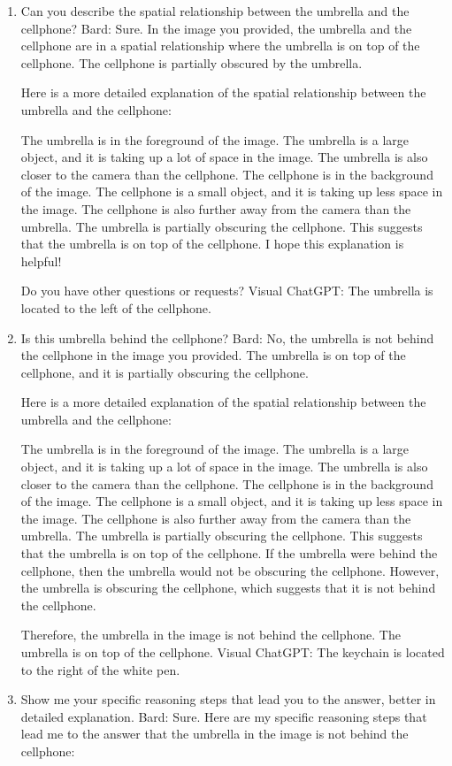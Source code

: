 \begin{enumerate}
    \item Can you describe the spatial relationship between the umbrella and the cellphone?
    \subitem Bard: 
    Sure. In the image you provided, the umbrella and the cellphone are in a spatial relationship where the umbrella is on top of the cellphone. The cellphone is partially obscured by the umbrella.
    
    Here is a more detailed explanation of the spatial relationship between the umbrella and the cellphone:
    
    The umbrella is in the foreground of the image. The umbrella is a large object, and it is taking up a lot of space in the image. The umbrella is also closer to the camera than the cellphone.
    The cellphone is in the background of the image. The cellphone is a small object, and it is taking up less space in the image. The cellphone is also further away from the camera than the umbrella.
    The umbrella is partially obscuring the cellphone. This suggests that the umbrella is on top of the cellphone.
    I hope this explanation is helpful!
    
    Do you have other questions or requests?
    \subitem Visual ChatGPT: The umbrella is located to the left of the cellphone.
    \item Is this umbrella behind the cellphone?
    \subitem Bard: 
    No, the umbrella is not behind the cellphone in the image you provided. The umbrella is on top of the cellphone, and it is partially obscuring the cellphone.
    
    Here is a more detailed explanation of the spatial relationship between the umbrella and the cellphone:
    
    The umbrella is in the foreground of the image. The umbrella is a large object, and it is taking up a lot of space in the image. The umbrella is also closer to the camera than the cellphone.
    The cellphone is in the background of the image. The cellphone is a small object, and it is taking up less space in the image. The cellphone is also further away from the camera than the umbrella.
    The umbrella is partially obscuring the cellphone. This suggests that the umbrella is on top of the cellphone.
    If the umbrella were behind the cellphone, then the umbrella would not be obscuring the cellphone. However, the umbrella is obscuring the cellphone, which suggests that it is not behind the cellphone.
    
    Therefore, the umbrella in the image is not behind the cellphone. The umbrella is on top of the cellphone.
    \subitem Visual ChatGPT: The keychain is located to the right of the white pen.
    \item Show me your specific reasoning steps that lead you to the answer, better in detailed explanation.
    \subitem Bard: Sure. Here are my specific reasoning steps that lead me to the answer that the umbrella in the image is not behind the cellphone:


\end{enumerate}
